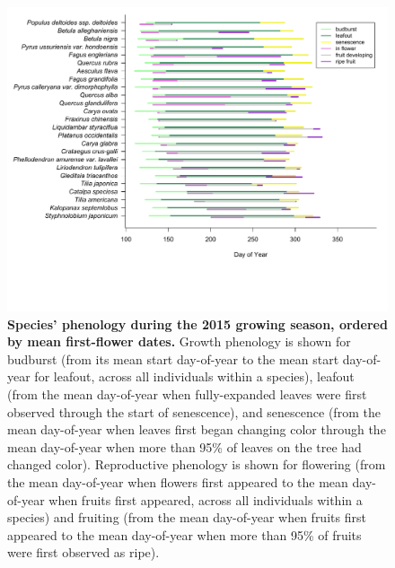 \documentclass{article}
\begin{document}
\begin{figure}[h]
 \centering
 \includegraphics{../analyses/figures/grosea_repsort_ripefruit_legend.pdf}
 \caption{\textbf{Species' phenology during the 2015 growing season, ordered by mean first-flower dates.} Growth phenology is shown for budburst (from its mean start day-of-year to the mean start day-of-year for leafout, across all individuals within a species), leafout (from the mean day-of-year when fully-expanded leaves were first observed through the start of senescence), and senescence (from the mean day-of-year when leaves first began changing color through the mean day-of-year when more than 95\% of leaves on the tree had changed color). Reproductive phenology is shown for flowering (from the mean day-of-year when flowers first appeared to the mean day-of-year when fruits first appeared, across all individuals within a species) and fruiting (from the mean day-of-year when fruits first appeared to the mean day-of-year when more than 95\% of fruits were first observed as ripe).}
 \label{fig:focsp}
\end{figure}
 
\end{document}
